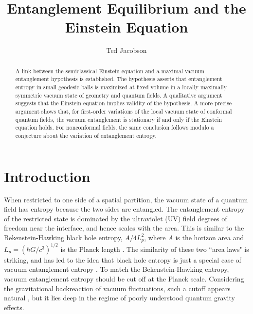 \documentclass[aps,prd,showpacs,groupedaddress,nofootinbib,longbibliography,12pt]{revtex4-1}
\begin{document}
\title{Entanglement Equilibrium and the Einstein Equation}

\author{Ted Jacobson}



\begin{abstract}

A link between the semiclassical Einstein equation and a maximal vacuum entanglement hypothesis is established. The hypothesis asserts that entanglement entropy in small geodesic balls is maximized at fixed volume in a locally maximally symmetric vacuum state of geometry and quantum fields. A qualitative argument suggests that the Einstein equation implies validity of the hypothesis. A more precise argument shows that, for first-order  variations of the local vacuum state of conformal quantum fields, the vacuum entanglement is stationary if and only if the Einstein equation holds. For nonconformal fields, the same conclusion follows modulo a conjecture about the variation of entanglement entropy.
\end{abstract}

\maketitle

\section{Introduction}

When restricted to one side of a spatial partition, the vacuum state of a quantum field has entropy because the two sides are entangled. The entanglement entropy of the restricted state is dominated by the ultraviolet (UV) field degrees of freedom near the interface, and hence scales with the area. This is similar to the Bekenstein-Hawking black hole entropy, $A/4L_p^2$, where $A$ is the horizon area and  $L_p = (\hbar G/c^3)^{1/2}$ is the Planck length  \cite{Bekenstein1972,Bekenstein1973,Hawking1974}. The similarity of these two ``area laws" is striking, and has led to the idea that black hole entropy is just a special case of vacuum entanglement entropy \cite{Sorkin1983,'tHooft1984,Bombellietal1986,FrolovNovikov1993,Srednicki1993,Solodukhin:2011gn}.
To match the Bekenstein-Hawking entropy, vacuum entanglement entropy should be cut off at the Planck scale.
Considering the gravitational backreaction of vacuum fluctuations, such a cutoff appears natural \cite{FrolovNovikov1993,Jacobson:2012yt}, but it lies deep in the regime of poorly understood quantum gravity effects. 
\end{document}
